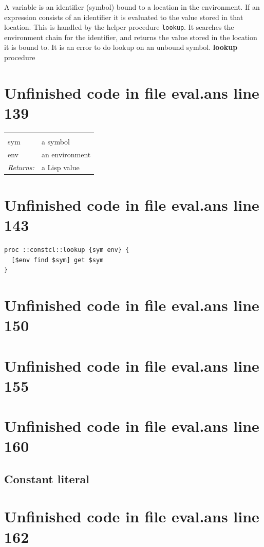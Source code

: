 \documentclass[twoside,9pt]{report}
\begin{document}
A variable is an identifier (symbol) bound to a location in the environment. If an expression consists of an identifier it is evaluated to the value stored in that location. This is handled by the helper procedure \texttt{lookup}. It searches the environment chain for the identifier, and returns the value stored in the location it is bound to. It is an error to do lookup on an unbound symbol. \textbf{lookup} procedure

\section{Unfinished code in file eval.ans line 139}
\noindent\begin{tabular}{ |p{1.9cm} p{8cm}| }
\hline
\rowcolor[HTML]{CCCCCC} \multicolumn{2}{|l|}{\bf lookup (internal)} \\
sym & a symbol \\
env & an environment \\
\textit{Returns:} & a Lisp value \\
\hline
\end{tabular}
\section{Unfinished code in file eval.ans line 143}
\begin{lstlisting}
proc ::constcl::lookup {sym env} {
  [$env find $sym] get $sym
}
\end{lstlisting}
\section{Unfinished code in file eval.ans line 150}
\section{Unfinished code in file eval.ans line 155}
\section{Unfinished code in file eval.ans line 160}
\subsection{Constant literal}
\label{constant-literal}
\section{Unfinished code in file eval.ans line 162}
\end{document}
